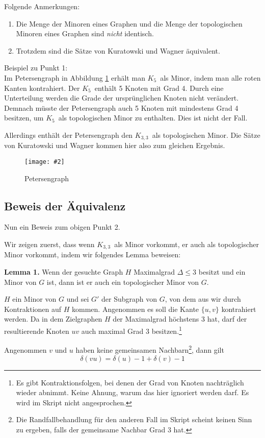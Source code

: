 \documentclass[10pt,a4paper]{article}
\makeatletter
\def\maxwidth#1{\ifdim\Gin@nat@width>#1 #1\else\Gin@nat@width\fi}
\newcommand{\imageFigure}[4]{%
    \begin{figure}[h]%
        \centering%
        {%
            \setlength{\fboxsep}{1pt}%
            \setlength{\fboxrule}{1pt}%
            \texttt{[image: \#2]}%
        }%
        \caption{#1}%
        \label{fig:#4}%
    \end{figure}%
}
\newcommand{\Kf}{$K_5$}
\newcommand{\Kdd}{$K_{3,3}$}
\makeatother
\begin{document}
Folgende Anmerkungen:
\begin{enumerate}
    \item Die Menge der Minoren eines Graphen und die Menge der topologischen
        Minoren eines Graphen sind \textit{nicht} identisch.
    \item Trotzdem sind die Sätze von Kuratowski und Wagner äquivalent.
\end{enumerate}

Beispiel zu Punkt 1:\\
Im Petersengraph in Abbildung \ref{fig:petersen} erhält man \Kf~als Minor,
indem man alle roten Kanten kontrahiert.
Der \Kf~enthält 5 Knoten mit Grad 4.
Durch eine Unterteilung werden die Grade der ursprünglichen Knoten nicht
verändert.
Demnach müsste der Petersengraph auch 5 Knoten mit mindestens Grad 4 besitzen,
um \Kf~als topologischen Minor zu enthalten.
Dies ist nicht der Fall.

Allerdings enthält der Petersengraph den \Kdd~als topologischen Minor.
Die Sätze von Kuratowski und Wagner kommen hier also zum gleichen Ergebnis.

\imageFigure{Petersengraph}{petersen.png}{.7}{petersen}


\subsection{Beweis der Äquivalenz}
Nun ein Beweis zum obigen Punkt 2.

Wir zeigen zuerst, dass wenn \Kdd~als Minor vorkommt, er auch als topologischer
Minor vorkommt, indem wir folgendes Lemma beweisen:

\textbf{Lemma 1.} Wenn der gesuchte Graph $H$ Maximalgrad $\Delta \leq 3$
besitzt und ein Minor von $G$ ist, dann ist er auch ein topologischer Minor von
$G$.

$H$ ein Minor von $G$ und sei $G'$ der Subgraph von $G$, von dem aus wir durch
Kontraktionen auf $H$ kommen.
Angenommen es soll die Kante $\{u,v\}$ kontrahiert werden.
Da in dem Zielgraphen $H$ der Maximalgrad höchstens 3 hat, darf der
resultierende Knoten $uv$ auch maximal Grad 3 besitzen.\footnote{Es gibt
Kontraktionsfolgen, bei denen der Grad von Knoten nachträglich wieder abnimmt.
Keine Ahnung, warum das hier ignoriert werden darf. Es wird im Skript nicht
angesprochen.}

Angenommen $v$ und $u$ haben keine gemeinsamen Nachbarn\footnote{Die
Randfallbehandlung für den anderen Fall im Skript scheint keinen Sinn zu
ergeben, falls der gemeinsame Nachbar Grad 3 hat.}, dann gilt
$$ \delta(vu) = \delta(u) - 1 + \delta(v) - 1 $$
\end{document}
